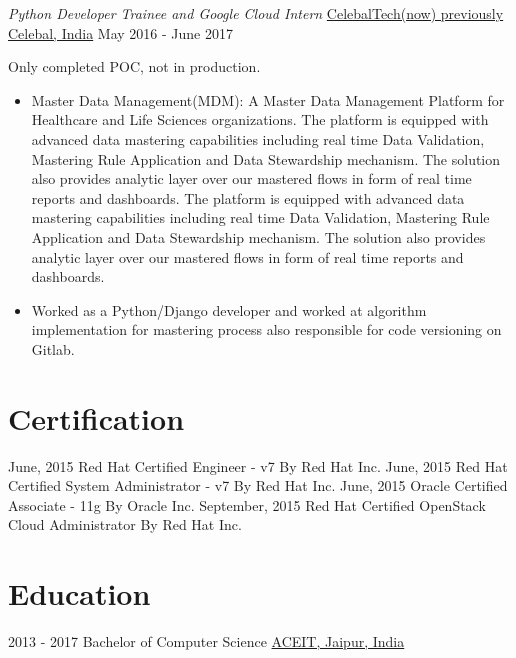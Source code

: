 \documentclass[]{friggeri-cv} %
\begin{document}
\begin{entrylist}
\entry
{\emph{Python Developer Trainee and Google Cloud Intern}}
{\href{http://www.celebaltech.com/#/}{CelebalTech(now) previously Celebal, India}}
{May 2016 - June 2017}
{ Only completed POC, not in production.
\begin{itemize}
\item {Master Data Management(MDM): A Master Data Management Platform for Healthcare and Life Sciences organizations. The platform is equipped with advanced data mastering capabilities including real time Data Validation, Mastering Rule Application and Data Stewardship mechanism. The solution also provides analytic layer over our mastered flows in form of real time reports and dashboards. The platform is equipped with advanced data mastering capabilities including real time Data Validation, Mastering Rule Application and Data Stewardship mechanism. The solution also provides analytic layer over our mastered flows in form of real time reports and dashboards.}
\item {Worked as a Python/Django developer and worked at algorithm implementation for
mastering process also responsible for code versioning on Gitlab.}
\end{itemize}}
\end{entrylist}

\section{Certification}

\begin{entrylist}
\aentry
{June, 2015}
{{Red Hat Certified Engineer - v7}}
{By {Red Hat Inc.}}
\aentry
{June, 2015}
{{Red Hat Certified System Administrator - v7}}
{By {Red Hat Inc.}}
\aentry
{June, 2015}
{{Oracle Certified Associate - 11g}}
{By {Oracle Inc.}}
\aentry
{September, 2015}
{{Red Hat Certified OpenStack Cloud Administrator}}
{By {Red Hat Inc.}}
\end{entrylist}


\section{Education}

\begin{entrylist}
\aentry
{2013 - 2017}
{{Bachelor} {\normalfont of Computer Science}}
{\href{https://aryacollege.in/}{ACEIT, Jaipur, India}}
\end{entrylist}
\end{document}
